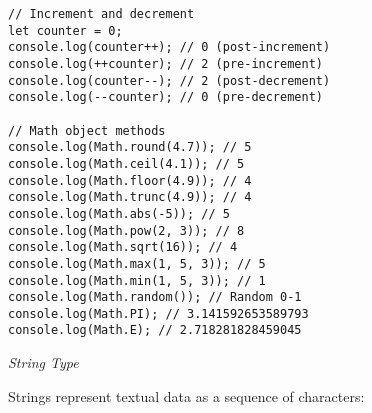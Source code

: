 \documentclass[12pt,a4paper,oneside]{book}
\newcommand{\mysubsubsection}[1]{%
    \vspace{0.1em}
    {\normalsize\itshape #1}
    \vspace{0.1em}
}
\begin{document}
\begin{lstlisting}[style=javascript, caption={\textbf{Number Type - Complete Examples}}, label=lst:number-type]
// Increment and decrement
let counter = 0;
console.log(counter++); // 0 (post-increment)
console.log(++counter); // 2 (pre-increment)
console.log(counter--); // 2 (post-decrement)
console.log(--counter); // 0 (pre-decrement)

// Math object methods
console.log(Math.round(4.7)); // 5
console.log(Math.ceil(4.1)); // 5
console.log(Math.floor(4.9)); // 4
console.log(Math.trunc(4.9)); // 4
console.log(Math.abs(-5)); // 5
console.log(Math.pow(2, 3)); // 8
console.log(Math.sqrt(16)); // 4
console.log(Math.max(1, 5, 3)); // 5
console.log(Math.min(1, 5, 3)); // 1
console.log(Math.random()); // Random 0-1
console.log(Math.PI); // 3.141592653589793
console.log(Math.E); // 2.718281828459045
\end{lstlisting}

\mysubsubsection{String Type}

Strings represent textual data as a sequence of characters:
\end{document}
